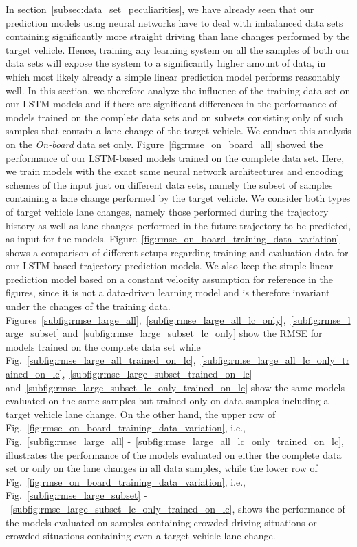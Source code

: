 In section~\ref{subsec:data_set_peculiarities}, we have already seen that our prediction models using neural networks have to deal with imbalanced data sets containing significantly more straight driving than lane changes performed by the target vehicle.
Hence, training any learning system on all the samples of both our data sets will expose the system to a significantly higher amount of data, in which most likely already a simple linear prediction model performs reasonably well. 
In this section, we therefore analyze the influence of the training data set on our \ac{LSTM} models and if there are significant differences in the performance of models trained on the complete data sets and on subsets consisting only of such samples that contain a lane change of the target vehicle.
We conduct this analysis on the \emph{On-board} data set only.
Figure~\ref{fig:rmse_on_board_all} showed the performance of our \ac{LSTM}-based models trained on the complete data set.
Here, we train models with the exact same neural network architectures and encoding schemes of the input just on different data sets, namely the subset of samples containing a lane change performed by the target vehicle.
We consider both types of target vehicle lane changes, namely those performed during the trajectory history as well as lane changes performed in the future trajectory to be predicted, as input for the models.
Figure~\ref{fig:rmse_on_board_training_data_variation} shows a comparison of different setups regarding training and evaluation data for our \ac{LSTM}-based trajectory prediction models.
We also keep the simple linear prediction model based on a constant velocity assumption for reference in the figures, since it is not a data-driven learning model and is therefore invariant under the changes of the training data.
Figures~\ref{subfig:rmse_large_all},~\ref{subfig:rmse_large_all_lc_only},~\ref{subfig:rmse_large_subset} and~\ref{subfig:rmse_large_subset_lc_only} show the \ac{RMSE} for models trained on the complete data set while Fig.~\ref{subfig:rmse_large_all_trained_on_lc},~\ref{subfig:rmse_large_all_lc_only_trained_on_lc},~\ref{subfig:rmse_large_subset_trained_on_lc} and~\ref{subfig:rmse_large_subset_lc_only_trained_on_lc} show the same models evaluated on the same samples but trained
only on data samples including a target vehicle lane change.
On the other hand, the upper row of Fig.~\ref{fig:rmse_on_board_training_data_variation}, i.e., Fig.~\ref{subfig:rmse_large_all} -~\ref{subfig:rmse_large_all_lc_only_trained_on_lc}, illustrates the performance of the models evaluated on either the complete data set or only on the lane changes in all data samples, while the lower row of Fig.~\ref{fig:rmse_on_board_training_data_variation}, i.e., Fig.~\ref{subfig:rmse_large_subset} -~\ref{subfig:rmse_large_subset_lc_only_trained_on_lc}, shows the performance
of the models evaluated on samples containing crowded driving situations or crowded situations containing even a target vehicle lane change.

